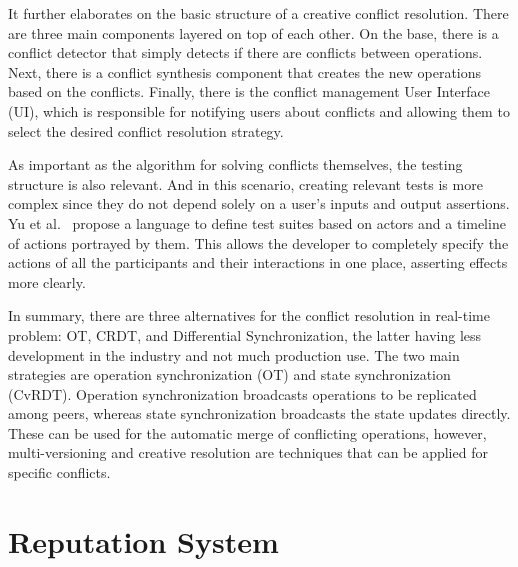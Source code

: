 It further elaborates on the basic structure of a creative conflict resolution. There are three main components layered on top of each other. On the base, there is a conflict detector that simply detects if there are conflicts between operations. Next, there is a conflict synthesis component that creates the new operations based on the conflicts. Finally, there is the conflict management User Interface (UI), which is responsible for notifying users about conflicts and allowing them to select the desired conflict resolution strategy.

As important as the algorithm for solving conflicts themselves, the testing structure is also relevant. And in this scenario, creating relevant tests is more complex since they do not depend solely on a user's inputs and output assertions. Yu et al.\ \cite{Yu2007} propose a language to define test suites based on actors and a timeline of actions portrayed by them. This allows the developer to completely specify the actions of all the participants and their interactions in one place, asserting effects more clearly.

In summary, there are three alternatives for the conflict resolution in real-time problem: OT, CRDT, and Differential Synchronization, the latter having less development in the industry and not much production use. The two main strategies are operation synchronization (OT) and state synchronization (CvRDT). Operation synchronization broadcasts operations to be replicated among peers, whereas state synchronization broadcasts the state updates directly. These can be used for the automatic merge of conflicting operations, however, multi-versioning and creative resolution are techniques that can be applied for specific conflicts.

\section{Reputation System}\label{sec:rep-sys-sota}

